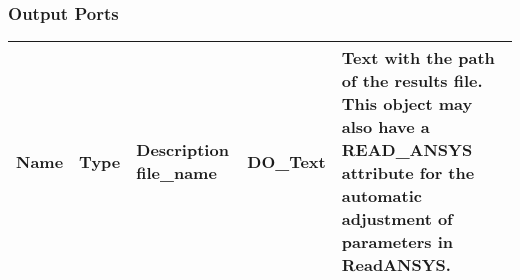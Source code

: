 \begin{htmlonly}
\begin{longtable}{|p{3.5cm}|p{4cm}|p{7cm}|}
                    
														

\hline
\end{longtable}



%
\subsubsection{Output Ports}
%

 
\begin{longtable}{|p{3.5cm}|p{4cm}|p{7cm}|}
\hline
   \bf{Name} & \bf{Type} & \bf{Description} \endhead
\hline\hline
	\textcolor{required}{file\_name} & DO\_Text& Text with the path of the results
                          file. This object may also have a READ\_ANSYS attribute for
                          the automatic adjustment of parameters in ReadANSYS. \\

\hline
\end{longtable}



\end{htmlonly}
